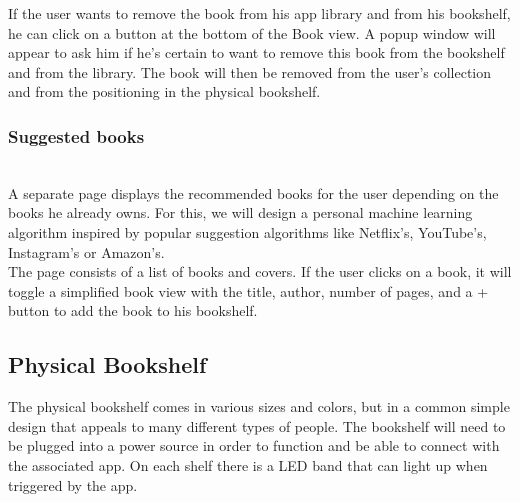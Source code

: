 \documentclass[conference]{IEEEtran}
\begin{document}
If the user wants to remove the book from his app library and from his bookshelf, he can click on a button at the bottom of the Book view. A popup window will appear to ask him if he's certain to want to remove this book from the bookshelf and from the library. The book will then be removed from the user's collection and from the positioning in the physical bookshelf.\\

\subsubsection{Suggested books}\hfill\\

A separate page displays the recommended books for the user depending on the books he already owns. For this, we will design a personal machine learning algorithm inspired by popular suggestion algorithms like Netflix's, YouTube's, Instagram's or Amazon's.\\
The page consists of a list of books and covers. If the user clicks on a book, it will toggle a simplified book view with the title, author, number of pages, and a + button to add the book to his bookshelf.\\


\subsection{Physical Bookshelf}

The physical bookshelf comes in various sizes and colors, but in a common simple design that appeals to many different types of people. The bookshelf will need to be plugged into a power source in order to function and be able to connect with the associated app. On each shelf there is a LED band that can light up when triggered by the app.\\
\end{document}
